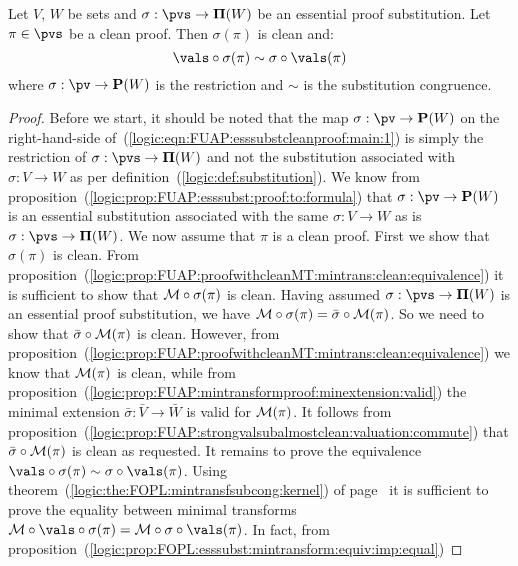 \begin{prop}\label{logic:prop:FUAP:esssubstcleanproof:main}
Let $V$, $W$ be sets and $\sigma:\pvs\to{\bf\Pi}(W)$ be an essential
proof substitution. Let $\pi\in\pvs$ be a clean proof. Then
$\sigma(\pi)$ is clean and:
    \begin{equation}\label{logic:eqn:FUAP:esssubstcleanproof:main:1}
    \vals\circ\sigma(\pi)\sim\sigma\circ\vals(\pi)
    \end{equation}
where $\sigma:\pv\to{\bf P}(W)$ is the restriction and $\sim$ is the
substitution congruence.
\end{prop}
\begin{proof}
Before we start, it should be noted that the map $\sigma:\pv\to{\bf
P}(W)$ on the right-hand-side
of~(\ref{logic:eqn:FUAP:esssubstcleanproof:main:1}) is simply the
restriction of $\sigma:\pvs\to{\bf\Pi}(W)$ and not the substitution
associated with $\sigma:V\to W$ as per
definition~(\ref{logic:def:substitution}). We know from
proposition~(\ref{logic:prop:FUAP:esssubst:proof:to:formula}) that
$\sigma:\pv\to{\bf P}(W)$ is an essential substitution associated
with the same $\sigma:V\to W$ as is $\sigma:\pvs\to{\bf\Pi}(W)$. We
now assume that $\pi$ is a clean proof. First we show that
$\sigma(\pi)$ is clean. From
proposition~(\ref{logic:prop:FUAP:proofwithcleanMT:mintrans:clean:equivalence})
it is sufficient to show that ${\cal M}\circ\sigma(\pi)$ is clean.
Having assumed $\sigma:\pvs\to{\bf\Pi}(W)$ is an essential proof
substitution, we have ${\cal
M}\circ\sigma(\pi)=\bar{\sigma}\circ{\cal M}(\pi)$. So we need to
show that $\bar{\sigma}\circ{\cal M}(\pi)$ is clean. However, from
proposition~(\ref{logic:prop:FUAP:proofwithcleanMT:mintrans:clean:equivalence})
we know that ${\cal M}(\pi)$ is clean, while from
proposition~(\ref{logic:prop:FUAP:mintransformproof:minextension:valid})
the minimal extension $\bar{\sigma}:\bar{V}\to\bar{W}$ is valid for
${\cal M}(\pi)$. It follows from
proposition~(\ref{logic:prop:FUAP:strongvalsubalmostclean:valuation:commute})
that $\bar{\sigma}\circ{\cal M}(\pi)$ is clean as requested. It
remains to prove the equivalence
$\vals\circ\sigma(\pi)\sim\sigma\circ\vals(\pi)$. Using
theorem~(\ref{logic:the:FOPL:mintransfsubcong:kernel}) of
page~\pageref{logic:the:FOPL:mintransfsubcong:kernel} it is
sufficient to prove the equality between minimal transforms ${\cal
M}\circ\vals\circ\sigma(\pi)={\cal M}\circ\sigma\circ\vals(\pi)$. In
fact, from
proposition~(\ref{logic:prop:FOPL:esssubst:mintransform:equiv:imp:equal})

\end{proof}
